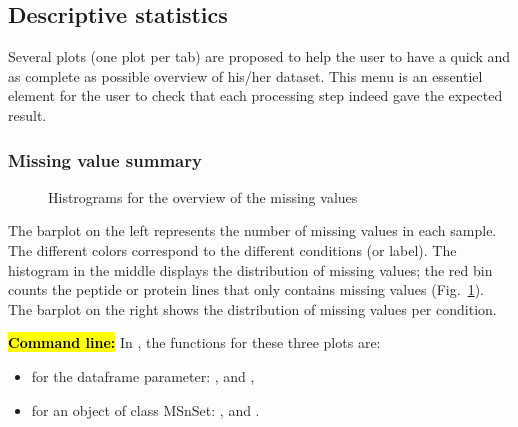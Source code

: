 \documentclass[12pt]{article}
\begin{document}
{%
\subsection{Descriptive statistics}\label{sec:descriptivestatistics}

Several plots (one plot per tab) are proposed to help the user to have a 
quick and as complete as possible overview of his/her dataset. This menu is 
an essentiel element for the user to check that each processing step indeed 
gave the expected result.


\subsubsection{Missing value summary}


\begin {figure}
\centering
{}
\caption{Histrograms for the overview of the missing values}\label{fig:sdmv}
\end {figure}

The barplot on the left represents the number of missing values in each 
sample. The different colors correspond to the different conditions (or label).
The histogram in the middle displays the distribution of missing values; the 
red bin counts the peptide or protein lines that only contains missing values 
(Fig.~\ref{fig:sdmv}).
{The barplot on the right shows the distribution of missing values per 
condition.}

\hl{\bf Command line:} In , the functions for these three 
plots are:
\begin{itemize}
\item for the dataframe parameter: , 
 and ,
\item for an object of class MSnSet: , 
 and 
.
\end{itemize}



}
\end{document}
